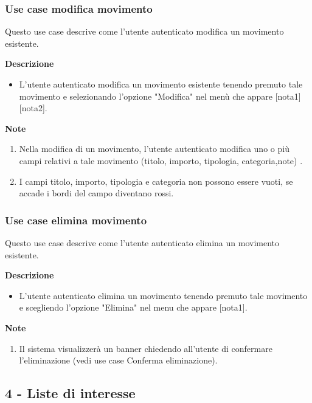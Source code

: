 \documentclass[a4paper,12pt]{article}
\begin{document}
\subsubsection*{Use case modifica movimento}

Questo use case descrive come l'utente autenticato modifica un movimento esistente.

\textbf{Descrizione}
\begin{itemize} \setlength\itemsep{0.01em}
\item L'utente autenticato modifica un movimento esistente tenendo premuto tale movimento e selezionando l'opzione "Modifica" nel menù che appare [nota1] [nota2].
\end{itemize}

\textbf{Note}
\begin{enumerate} \setlength\itemsep{0.01em}
\item Nella modifica di un movimento, l'utente autenticato modifica uno o più campi relativi a tale movimento (titolo, importo, tipologia, categoria,note) .
\item I campi titolo, importo, tipologia e categoria non possono essere vuoti, se accade i bordi del campo diventano rossi.
\end{enumerate}



\subsubsection*{Use case elimina movimento}

Questo use case descrive come l'utente autenticato elimina un movimento esistente.

\textbf{Descrizione}
\begin{itemize} \setlength\itemsep{0.01em}
\item L'utente autenticato elimina un movimento tenendo premuto tale movimento e scegliendo l'opzione "Elimina" nel menu che appare [nota1].
\end{itemize}

\textbf{Note}
\begin{enumerate} \setlength\itemsep{0.01em}
\item Il sistema visualizzerà un banner chiedendo all'utente di confermare l'eliminazione  (vedi use case Conferma eliminazione).
\end{enumerate}



\subsection*{4 - Liste di interesse}
\end{document}
